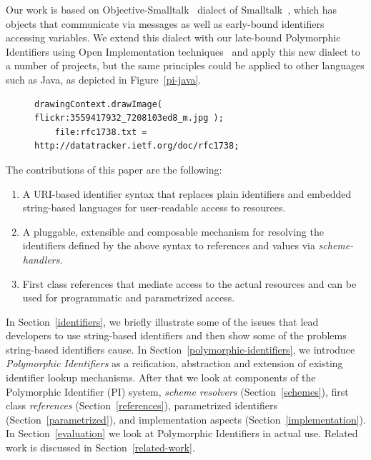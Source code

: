 \documentclass{acm_proc_article-sp}
\begin{document}
Our work is based on Objective-Smalltalk~\cite{objst} dialect of Smalltalk~\cite{Goldberg1983}, which has objects
that communicate via messages as well as early-bound identifiers accessing variables.  We extend
this dialect with our late-bound Polymorphic Identifiers using Open Implementation techniques~\cite{OpenImplementations} and apply this new dialect to a number of
projects, but the same principles could be applied to other languages such as Java, as depicted in
Figure~\ref{pi-java}.


\begin{figure}[htbp]
\begin{lstlisting}[style=numbers,label=pi-java,caption=Draw a remote image and download an RFC with Polymorphic Identifiers in Java.]
	drawingContext.drawImage( flickr:3559417932_7208103ed8_m.jpg );
	file:rfc1738.txt = http://datatracker.ietf.org/doc/rfc1738;
\end{lstlisting}
\end{figure}



The contributions of this paper are the following:
\begin{enumerate} 

\item A URI-based identifier syntax that replaces plain identifiers
	and embedded string-based languages for user-readable access to resources.

\item A pluggable, extensible and composable mechanism for resolving the
	identifiers defined by the above syntax to references and values via \emph{scheme-handlers}.

\item First class references that mediate access to the actual resources and can be used
	for programmatic and parametrized access.
	 
	
\end{enumerate}



In Section~\ref{identifiers}, we briefly illustrate some of the issues that lead developers to use string-based
identifiers and then show some of 
the problems string-based identifiers cause.  In Section~\ref{polymorphic-identifiers}, we 
introduce \emph{Polymorphic Identifiers} as a reification, abstraction and extension of existing 
identifier lookup mechanisms.  After that we look at components of the Polymorphic Identifier (PI)
system, \emph{scheme resolvers} (Section~\ref{schemes}), first class \emph{references} (Section~\ref{references}),
parametrized identifiers (Section~\ref{parametrized}), and  implementation aspects (Section~\ref{implementation}).
In Section~\ref{evaluation} we look at Polymorphic Identifiers in actual use.  Related work is discussed in Section~\ref{related-work}.
\end{document}

